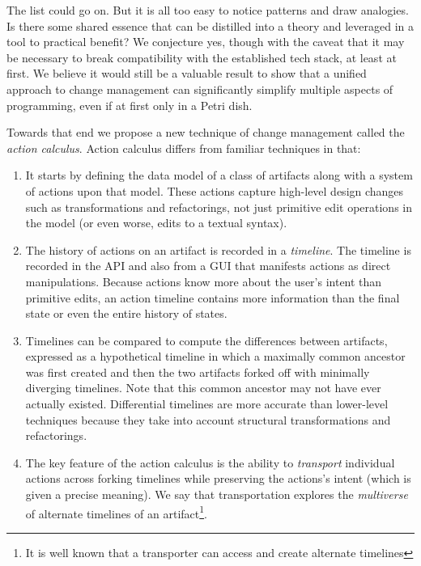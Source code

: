 \documentclass[english,submission]{programming}
\theoremstyle{definition}
\begin{document}
\medskip
The list could go on. But it is all too easy to notice patterns and draw analogies. Is there some shared essence that can be distilled into a theory and leveraged in a tool to practical benefit? We conjecture yes, though with the caveat that it may be necessary to break compatibility with the established tech stack, at least at first. We believe it would still be a valuable result to show that a unified approach to change management can significantly simplify multiple aspects of programming, even if at first only in a Petri dish.

Towards that end we propose a new technique of change management called the \textit{action calculus}. Action calculus differs from familiar techniques in that:
\begin{enumerate}

  \item It starts by defining the data model of a class of artifacts along with a system of actions upon that model. These actions capture high-level design changes such as transformations and refactorings, not just primitive edit operations in the model (or even worse, edits to a textual syntax).

  \item The history of actions on an artifact is recorded in a \textit{timeline}. The timeline is recorded in the API and also from a GUI that manifests actions as direct manipulations.
  Because actions know more about the user's intent than primitive edits, an action timeline contains more information than the final state or even the entire history of states.

  \item Timelines can be compared to compute the differences between artifacts, expressed as a hypothetical timeline in which a maximally common ancestor was first created and then the two artifacts forked off with minimally diverging timelines. Note that this common ancestor may not have ever actually existed.
  Differential timelines are more accurate than lower-level techniques because they take into account structural transformations and refactorings.

  \item The key feature of the action calculus is the ability to \textit{transport} individual actions across forking timelines while preserving the actions's intent (which is given a precise meaning).
  We say that transportation explores the \textit{multiverse} of alternate timelines of an artifact\footnote{It is well known that a transporter can access and create alternate timelines\cite{mirrormirror}}.


\end{enumerate}
\end{document}
